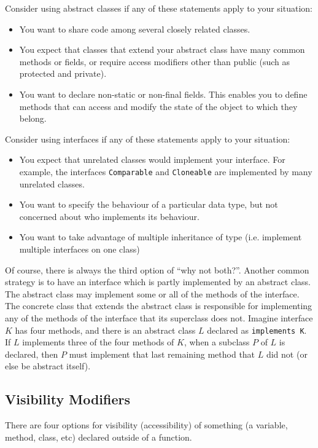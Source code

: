 Consider using abstract classes if any of these statements apply to your situation:
\begin{itemize}
\item You want to share code among several closely related classes.
\item You expect that classes that extend your abstract class have many common methods or fields, or require access modifiers other than public (such as protected and private).
\item You want to declare non-static or non-final fields. This enables you to define methods that can access and modify the state of the object to which they belong.
\end{itemize}

Consider using interfaces if any of these statements apply to your situation:
\begin{itemize}
\item You expect that unrelated classes would implement your interface. For example, the 
interfaces \texttt{Comparable} and \texttt{Cloneable} are implemented by many unrelated classes.
\item You want to specify the behaviour of a particular data type, but not concerned about who implements its behaviour.
\item You want to take advantage of multiple inheritance of type (i.e. implement multiple interfaces on one class)
\end{itemize}

Of course, there is always the third option of ``why not both?''. Another common strategy is to have an interface which is partly implemented by an abstract class. The abstract class  may implement some or all of the methods of the interface. The concrete class that extends the abstract class is responsible for implementing any of the methods of the interface that its superclass does not. Imagine interface $K$ has four methods, and there is an abstract class $L$ declared as \texttt{implements K}. If $L$ implements three of the four methods of $K$, when a subclass $P$ of $L$ is declared, then $P$ must implement that last remaining method that $L$ did not (or else be abstract itself).

\subsection*{Visibility Modifiers}

There are four options for visibility (accessibility) of something (a variable, method, class, etc) declared outside of a function. 

